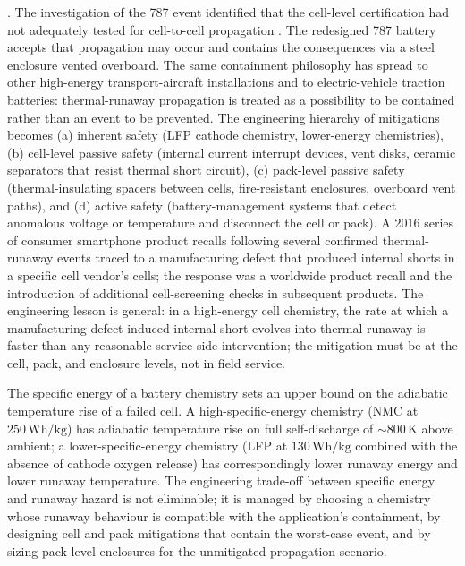 . The investigation of the 787
event identified that the cell-level certification had not adequately
tested for cell-to-cell propagation \cite[pp.~111--120]{acc:ntsb-aar14-01-787-battery}.
The redesigned 787 battery accepts that propagation may occur and
contains the consequences via a steel enclosure vented overboard.
The same containment philosophy has spread to other high-energy
transport-aircraft installations and to electric-vehicle traction
batteries: thermal-runaway propagation is treated as a possibility to
be contained rather than an event to be prevented. The engineering
hierarchy of mitigations becomes (a) inherent safety (LFP cathode
chemistry, lower-energy chemistries), (b) cell-level passive safety
(internal current interrupt devices, vent disks, ceramic separators
that resist thermal short circuit), (c) pack-level passive safety
(thermal-insulating spacers between cells, fire-resistant enclosures,
overboard vent paths), and (d) active safety (battery-management
systems that detect anomalous voltage or temperature and disconnect
the cell or pack). A 2016 series of consumer smartphone product
recalls following several confirmed thermal-runaway events traced to
a manufacturing defect that produced internal shorts in a specific
cell vendor's cells; the response was a worldwide product recall and
the introduction of additional cell-screening checks in subsequent
products. The engineering lesson is general: in a high-energy cell
chemistry, the rate at which a manufacturing-defect-induced internal
short evolves into thermal runaway is faster than any reasonable
service-side intervention; the mitigation must be at the cell, pack,
and enclosure levels, not in field service.

\begin{principle}
The specific energy of a battery chemistry sets an upper bound on the
adiabatic temperature rise of a failed cell. A high-specific-energy
chemistry (NMC at $250\,\text{Wh}/\text{kg}$) has adiabatic temperature
rise on full self-discharge of $\sim 800\,\si{\kelvin}$ above ambient;
a lower-specific-energy chemistry (LFP at $130\,\text{Wh}/\text{kg}$
combined with the absence of cathode oxygen release) has
correspondingly lower runaway energy and lower runaway temperature.
The engineering trade-off between specific energy and runaway hazard
is not eliminable; it is managed by choosing a chemistry whose runaway
behaviour is compatible with the application's containment, by
designing cell and pack mitigations that contain the worst-case event,
and by sizing pack-level enclosures for the unmitigated propagation
scenario.
\end{principle}

